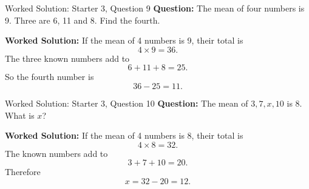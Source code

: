 \documentclass{beamer}
\begin{document}
\begin{frame}{Worked Solution: Starter 3, Question 9}
\textbf{Question:} The mean of four numbers is 9. Three are 6, 11 and 8. Find the fourth.

\textbf{Worked Solution:}
If the mean of 4 numbers is 9, their total is
\[
4 \times 9 = 36.
\]
The three known numbers add to
\[
6 + 11 + 8 = 25.
\]
So the fourth number is
\[
36 - 25 = 11.
\]
\end{frame}

\begin{frame}{Worked Solution: Starter 3, Question 10}
\textbf{Question:} The mean of \(3, 7, x, 10\) is \(8\). What is \(x\)?

\textbf{Worked Solution:}
If the mean of 4 numbers is 8, their total is
\[
4 \times 8 = 32.
\]
The known numbers add to
\[
3 + 7 + 10 = 20.
\]
Therefore
\[
x = 32 - 20 = 12.
\]
\end{frame}
\end{document}
